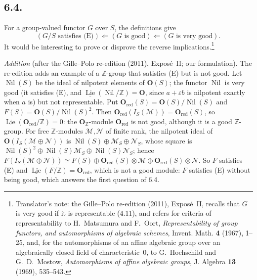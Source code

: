 \subsection*{6.4.}
For a group-valued functor \(G\) over \(S\), the definitions give
\[
 (G/S\text{ satisfies (E)})
 \Longleftarrow(G\text{ is good})
 \Longleftarrow(G\text{ is very good}).
\]
It would be interesting to prove or disprove the reverse
implications.\footnote{Translator's note: the Gille--Polo re-edition (2011),
Expos\'e~II, recalls that \(G\) is very good if it is representable (4.11),
and refers for criteria of representability to H.~Matsumura and F.~Oort,
\emph{Representability of group functors, and automorphisms of algebraic
schemes}, Invent. Math. \textbf{4} (1967), 1--25, and, for the
automorphisms of an affine algebraic group over an algebraically closed
field of characteristic~\(0\), to G.~Hochschild and G.~D.~Mostow,
\emph{Automorphisms of affine algebraic groups}, J. Algebra \textbf{13}
(1969), 535--543.}

\par\medskip\noindent
\emph{Addition} (after the Gille--Polo re-edition (2011), Expos\'e~II; our
formulation). The re-edition adds an example of a \(\mathbb Z\)-group that
satisfies (E) but is not good. Let \(\operatorname{Nil}(S)\) be the ideal
of nilpotent elements of \(\mathbf O(S)\); the functor \(\operatorname{Nil}\)
is very good (it satisfies (E), and
\(\underline{\operatorname{Lie}}(\operatorname{Nil}/\mathbb Z)=\mathbf O\),
since \(a+\varepsilon b\) is nilpotent exactly when \(a\) is) but not
representable. Put \(\mathbf O_{\mathrm{red}}(S)=\mathbf O(S)/\operatorname{Nil}(S)\)
and \(F(S)=\mathbf O(S)/\operatorname{Nil}(S)^2\). Then
\(\mathbf O_{\mathrm{red}}(I_S(\mathscr M))=\mathbf O_{\mathrm{red}}(S)\), so
\(\underline{\operatorname{Lie}}(\mathbf O_{\mathrm{red}}/\mathbb Z)=0\): the
\(\mathbf O_{\mathbb Z}\)-module \(\mathbf O_{\mathrm{red}}\) is not good,
although it is a good \(\mathbb Z\)-group. For free \(\mathbb Z\)-modules
\(\mathscr M,\mathscr N\) of finite rank, the nilpotent ideal of
\(\mathbf O(I_S(\mathscr M\oplus\mathscr N))\) is
\(\operatorname{Nil}(S)\oplus\mathscr M_S\oplus\mathscr N_S\), whose square
is \(\operatorname{Nil}(S)^2\oplus\operatorname{Nil}(S)\mathscr M_S\oplus
\operatorname{Nil}(S)\mathscr N_S\); hence
\(F(I_S(\mathscr M\oplus\mathscr N))\simeq F(S)\oplus
\mathbf O_{\mathrm{red}}(S)\otimes\mathscr M\oplus
\mathbf O_{\mathrm{red}}(S)\otimes\mathscr N\). So \(F\) satisfies (E) and
\(\underline{\operatorname{Lie}}(F/\mathbb Z)=\mathbf O_{\mathrm{red}}\),
which is not a good module: \(F\) satisfies (E) without being good, which
answers the first question of 6.4.
\par\medskip


